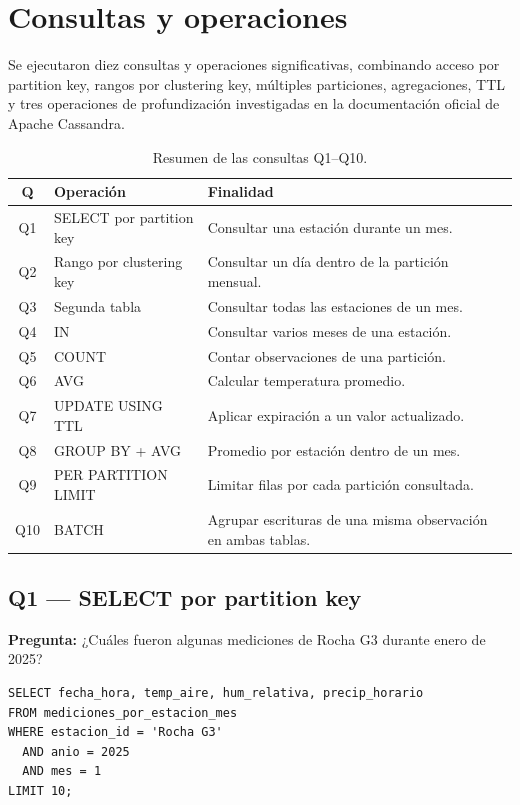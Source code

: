 \section{Consultas y operaciones}

Se ejecutaron diez consultas y operaciones significativas, combinando acceso por partition key, rangos por clustering key, múltiples particiones, agregaciones, TTL y tres operaciones de profundización investigadas en la documentación oficial de Apache Cassandra.

\begin{table}[H]
\centering
\caption{Resumen de las consultas Q1--Q10.}
\label{tab:consultas}
\begin{tabularx}{\linewidth}{c>{\raggedright\arraybackslash}p{4.2cm}X}
\toprule
\textbf{Q} & \textbf{Operación} & \textbf{Finalidad} \\
\midrule
Q1 & SELECT por partition key & Consultar una estación durante un mes. \\
Q2 & Rango por clustering key & Consultar un día dentro de la partición mensual. \\
Q3 & Segunda tabla & Consultar todas las estaciones de un mes. \\
Q4 & IN & Consultar varios meses de una estación. \\
Q5 & COUNT & Contar observaciones de una partición. \\
Q6 & AVG & Calcular temperatura promedio. \\
Q7 & UPDATE USING TTL & Aplicar expiración a un valor actualizado. \\
Q8 & GROUP BY + AVG & Promedio por estación dentro de un mes. \\
Q9 & PER PARTITION LIMIT & Limitar filas por cada partición consultada. \\
Q10 & BATCH & Agrupar escrituras de una misma observación en ambas tablas. \\
\bottomrule
\end{tabularx}
\end{table}

\subsection{Q1 --- SELECT por partition key}

\textbf{Pregunta:} ¿Cuáles fueron algunas mediciones de Rocha G3 durante enero de 2025?

\begin{lstlisting}[language=CQL]
SELECT fecha_hora, temp_aire, hum_relativa, precip_horario
FROM mediciones_por_estacion_mes
WHERE estacion_id = 'Rocha G3'
  AND anio = 2025
  AND mes = 1
LIMIT 10;
\end{lstlisting}

